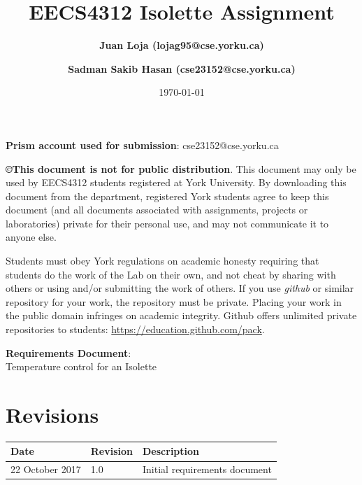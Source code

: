 \documentclass[fontsize=12pt,paper=letter,twoside]{scrartcl}
\author{\textbf{Juan Loja (lojag95@cse.yorku.ca)}
\and \textbf{Sadman Sakib Hasan (cse23152@cse.yorku.ca)}
}
\date{\today} %
\begin{document}
\title{EECS4312 Isolette Assignment}
\maketitle

\noindent \textbf{Prism account used for submission}: cse23152@cse.yorku.ca

\begin {mdframed}
\textbf{\copyright This document is not for public distribution}. This document may only be used by EECS4312 students registered at York University. By downloading this document from the department, registered York students agree to keep this document (and all documents associated with assignments, projects or laboratories) private for their personal use, and may not communicate it to anyone else. 

Students must obey York regulations on academic honesty requiring that students do the work of the Lab on their own, and not cheat by sharing with others or using and/or submitting the work of others. If you use \textit{github} or similar repository for your work,  the repository must be private. Placing your work in the public domain infringes on academic integrity. Github offers unlimited private repositories to students: \url{https://education.github.com/pack}.

\end {mdframed}

\newpage

\vspace*{2in}
\begin{center}
\huge{\textbf{Requirements Document}:\\ Temperature control for an Isolette}
\end{center}

\bigskip\bigskip

\section*{Revisions}

\begin{tabular}{|l|l|p{3in}|}
\hline
Date & Revision& Description \\ 
\hline
22 October  2017
& 1.0       
& Initial requirements document\\ 
\hline
\end{tabular}

\newpage
\end{document}
